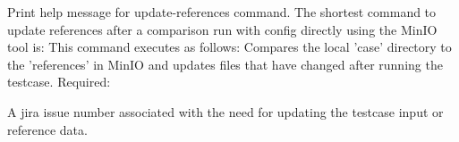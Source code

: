 \documentclass{deltares_memo}
\begin{document}
Print help message for update-references command.
\newline
{}
\newline
\newline
The shortest command to update references after a comparison run with config directly using the MinIO tool is: 
\newline
{}
\newline
This command executes as follows: Compares the local 'case' directory to the 'references' in MinIO and updates files that have changed after running the testcase.
\newline
\newline
Required:
\begin{guilist}
	\item[\texttt{-{}-issue-id}] A jira issue number associated with the need for updating the testcase input or reference data.
\end{guilist}
\end{document}
